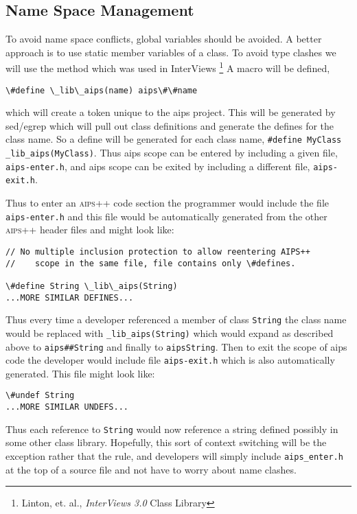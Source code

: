 \subsection{Name Space Management}
To avoid name space conflicts, global variables should be avoided. A better
approach is to use static member variables of a class.
To avoid type clashes we will use the method which was used in InterViews
\footnote{Linton, et. al., \emph{InterViews 3.0} Class Library}
A macro will be defined,
\begin{verbatim}
\#define \_lib\_aips(name) aips\#\#name
\end{verbatim}
\noindent
which will create a token unique to the aips project. This will be generated by 
sed/egrep which will pull out class definitions and generate the defines
for the class name. So a define will be generated for each class name,
\texttt{\#define MyClass \_lib\_aips(MyClass)}. Thus aips scope can be entered
by including a given file, \texttt{aips-enter.h}, and aips scope can be exited by 
including a different file, \texttt{aips-exit.h}.

Thus to enter an \textsc{aips++} code section the programmer would include the file
\texttt{aips-enter.h} and this file would be automatically generated from the 
other \textsc{aips++} header files and might look like:
\begin{verbatim}
// No multiple inclusion protection to allow reentering AIPS++
//    scope in the same file, file contains only \#defines.

\#define String \_lib\_aips(String)
...MORE SIMILAR DEFINES...
\end{verbatim}
\noindent
Thus every time a developer referenced a member of class \texttt{String} the
class name would be replaced with \texttt{\_lib\_aips(String)} which would
expand as described above to \texttt{aips\#\#String} and finally to 
\texttt{aipsString}. Then to exit the scope of aips code the developer would
include file \texttt{aips-exit.h} which is also automatically generated. This
file might look like:
\begin{verbatim}
\#undef String
...MORE SIMILAR UNDEFS...
\end{verbatim}
\noindent
Thus each reference to \texttt{String} would now reference a string defined
possibly in some other class library. Hopefully, this sort of context
switching will be the exception rather that the rule, and developers 
will simply include \texttt{aips\_enter.h} at the top of a source file
and not have to worry about name clashes.

